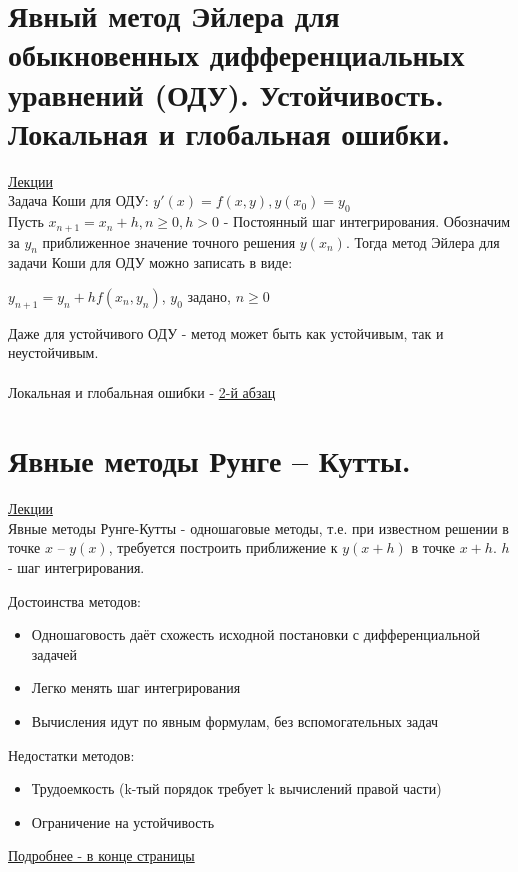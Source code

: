 \documentclass[specialist, subf, href, colorlinks=true, 12pt, times, mtpro, final]{disser}
\theoremstyle{definition}
\begin{document}
{    

\section {Явный метод Эйлера для обыкновенных дифференциальных уравнений (ОДУ). Устойчивость. Локальная и глобальная ошибки.}
    \hyperlink {lects.87}{Лекции}\\
    Задача Коши для ОДУ: 
    $y'(x)=f(x,y), y(x_0) = y_0$\\
    
    Пусть $x_{n+1} = x_n + h, n \geq 0, h > 0$ - Постоянный шаг интегрирования. Обозначим за $y_n$ приближенное значение точного решения $y(x_n)$. Тогда метод Эйлера для задачи Коши для ОДУ можно записать в виде:\\
    \begin{center}
    $y_{n+1} = y_n + h f(x_n, y_n)$, $y_0$ задано, $n \geq 0$
    \end{center}

Даже для устойчивого ОДУ -  метод может быть как устойчивым, так и неустойчивым.\\
\\
Локальная и глобальная ошибки - \hyperlink {lects.88}{2-й абзац}


\section {Явные методы Рунге -- Кутты.}
    \hyperlink {lects.89}{Лекции}\\
    
    Явные методы Рунге-Кутты - одношаговые методы, т.е. при известном решении в точке $x$ \--- $y(x)$, требуется построить приближение к $y(x+h)$ в точке $x+h$. $h$ - шаг интегрирования.
    
    Достоинства методов:
    \begin{itemize}
    \item Одношаговость даёт схожесть исходной постановки с дифференциальной задачей
    \item Легко менять шаг интегрирования
    \item Вычисления идут по явным формулам, без вспомогательных задач
    \end{itemize}
    Недостатки методов:
    \begin{itemize}
    \item Трудоемкость (k-тый порядок требует k вычислений правой части)
    \item Ограничение на устойчивость 
    \end{itemize}
    \hyperlink {lects.90}{Подробнее - в конце страницы}\\

}
\end{document}
